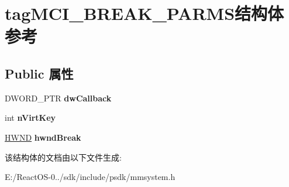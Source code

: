 \hypertarget{structtag_m_c_i___b_r_e_a_k___p_a_r_m_s}{}\section{tag\+M\+C\+I\+\_\+\+B\+R\+E\+A\+K\+\_\+\+P\+A\+R\+M\+S结构体 参考}
\label{structtag_m_c_i___b_r_e_a_k___p_a_r_m_s}
\subsection*{Public 属性}
\begin{DoxyCompactItemize}
\item 
\mbox{\label{structtag_m_c_i___b_r_e_a_k___p_a_r_m_s_afa7a3d5a99e77f46799dd31db3ec2912}} 
D\+W\+O\+R\+D\+\_\+\+P\+TR {\bfseries dw\+Callback}
\item 
\mbox{\label{structtag_m_c_i___b_r_e_a_k___p_a_r_m_s_ab34fa2a103dcb8d4b4cd2825ee9871a6}} 
int {\bfseries n\+Virt\+Key}
\item 
\mbox{\label{structtag_m_c_i___b_r_e_a_k___p_a_r_m_s_a161e24b44b37d0cc79deda41404e4224}} 
\hyperlink{interfacevoid}{H\+W\+ND} {\bfseries hwnd\+Break}
\end{DoxyCompactItemize}


该结构体的文档由以下文件生成\+:\begin{DoxyCompactItemize}
\item 
E\+:/\+React\+O\+S-\/0../sdk/include/psdk/mmsystem.\+h\end{DoxyCompactItemize}
